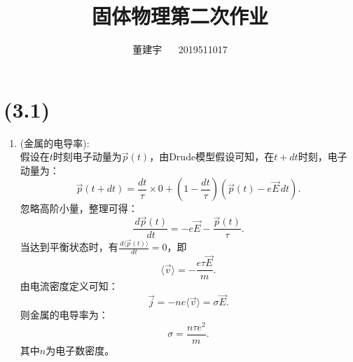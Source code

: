 \documentclass[reqno,a4paper,12pt]{amsart}
\title{固体物理第二次作业}
\author{董建宇 ~~ 2019511017}
\begin{document}
\maketitle
\titleformat{\section}[hang]{\small}{\thesection}{0.8em}{}{}
\titleformat{\subsection}[hang]{\small}{\thesubsection}{0.8em}{}{}


\section{(3.1)}
\begin{enumerate}
	\item (金属的电导率): \\
	假设在$t$时刻电子动量为$\vec{p}(t)$，由Drude模型假设可知，在$t+dt$时刻，电子动量为：
	\[
		\vec{p}(t+dt) = \frac{dt}{\tau} \times 0 + \left( 1-\frac{dt}{\tau} \right) \left( \vec{p}(t) - e\vec{E}\,dt \right).
	\]
	忽略高阶小量，整理可得：
	\[
		\frac{\,d\vec{p}(t)}{\,dt} = -e\vec{E} - \frac{\vec{p}(t)}{\tau}.
	\]
	当达到平衡状态时，有$\frac{\,d\langle \vec{p}(t) \rangle}{\,dt} = 0$，即
	\[
		\langle \vec{v} \rangle = -\frac{e\tau \vec{E}}{m}.
	\]
	由电流密度定义可知：
	\[
		\vec{j} = -ne\langle \vec{v} \rangle = \sigma \vec{E}.
	\]
	则金属的电导率为：
	\[
		\sigma = \frac{n\tau e^2}{m}.
	\]
	其中$n$为电子数密度。
	

\end{enumerate}
\end{document}
